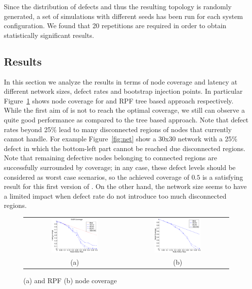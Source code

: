 Since the distribution of defects and thus the resulting topology is randomly
generated, a set of simulations with different seeds has been run
for each system configuration. We found that 20 repetitions are
required in order to obtain statistically significant results.


\subsection{Results}
\label{sec:results}

In this section we analyze the results in terms of node
coverage and latency at different network sizes, defect rates and
bootstrap injection points.  In particular
Figure~\ref{fig:results_coverage} shows
node coverage for \disr{} and RPF tree based approach respectively. While
the first aim of \disr{} is not to reach the optimal coverage, we still
can observe a quite good performance as compared to the tree based
approach. Note that defect rates beyond 25\% lead to many disconnected
regions of nodes that \disr{} currently cannot handle.
For example Figure~\ref{fig:net} show a 30x30 network with a 25\%
defect in which the bottom-left part cannot be reached due
disconnected regions. Note that remaining defective nodes belonging to
connected regions are successfully surrounded by \disr{} coverage; in any
case, these defect levels should be considered as worst case scenarios, so the
achieved coverage of $0.5$ is a satisfying result for this first
version of \disr{}. On the other hand, the network size seems to have a
limited impact when defect rate do not introduce too much disconnected
regions. 
\begin{figure}
\centering
\begin{tabular}{cc}
\includegraphics[width=0.48\textwidth]{pictures/set1.eps} & 
\includegraphics[width=0.48\textwidth]{pictures/coverage.eps} \\
(a) & (b) 
\end{tabular}
\caption{\disr{} (a) and RPF (b) node coverage}
\label{fig:results_coverage}
\end{figure}


